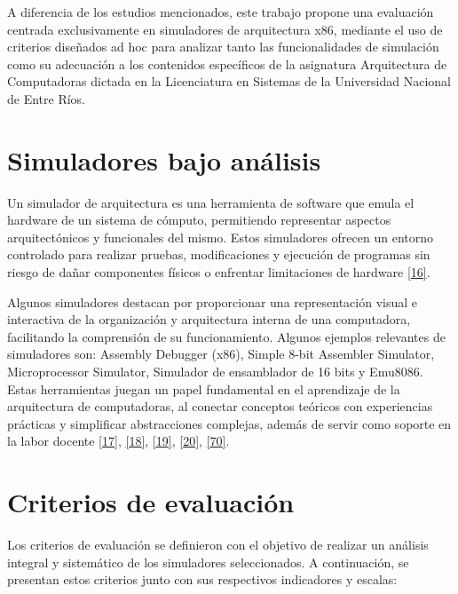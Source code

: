 \documentclass[12pt,oneside]{templates/unerthesis}
\begin{document}
A diferencia de los estudios mencionados, este trabajo propone una evaluación centrada exclusivamente en simuladores de arquitectura x86, mediante el uso de criterios diseñados ad hoc para analizar tanto las funcionalidades de simulación como su adecuación a los contenidos específicos de la asignatura Arquitectura de Computadoras dictada en la Licenciatura en Sistemas de la Universidad Nacional de Entre Ríos.

\hypertarget{simuladores-bajo-anuxe1lisis}{%
\section{Simuladores bajo análisis}\label{simuladores-bajo-anuxe1lisis}}

Un simulador de arquitectura es una herramienta de software que emula el hardware de un sistema de cómputo, permitiendo representar aspectos arquitectónicos y funcionales del mismo. Estos simuladores ofrecen un entorno controlado para realizar pruebas, modificaciones y ejecución de programas sin riesgo de dañar componentes físicos o enfrentar limitaciones de hardware \protect\hyperlink{ref-radivojevic_design_2011}{{[}16{]}}.

Algunos simuladores destacan por proporcionar una representación visual e interactiva de la organización y arquitectura interna de una computadora, facilitando la comprensión de su funcionamiento. Algunos ejemplos relevantes de simuladores son: Assembly Debugger (x86), Simple 8-bit Assembler Simulator, Microprocessor Simulator, Simulador de ensamblador de 16 bits y Emu8086. Estas herramientas juegan un papel fundamental en el aprendizaje de la arquitectura de computadoras, al conectar conceptos teóricos con experiencias prácticas y simplificar abstracciones complejas, además de servir como soporte en la labor docente \protect\hyperlink{ref-nikolic_survey_2009}{{[}17{]}}, \protect\hyperlink{ref-hasan_survey_2012}{{[}18{]}}, \protect\hyperlink{ref-hennessy2017computer}{{[}19{]}}, \protect\hyperlink{ref-stallings_computer_2021}{{[}20{]}}, \protect\hyperlink{ref-behrooz_computer_2005}{{[}70{]}}.

\hypertarget{criterios-de-evaluaciuxf3n}{%
\section{Criterios de evaluación}\label{criterios-de-evaluaciuxf3n}}

Los criterios de evaluación se definieron con el objetivo de realizar un análisis integral y sistemático de los simuladores seleccionados. A continuación, se presentan estos criterios junto con sus respectivos indicadores y escalas:
\end{document}
